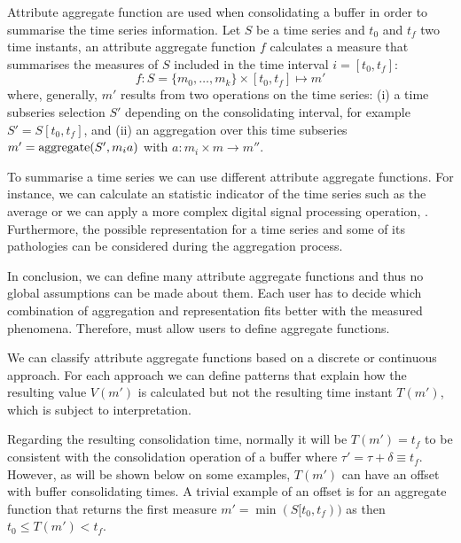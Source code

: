 Attribute aggregate function are used when consolidating a buffer in
order to summarise the time series information. Let $S$ be a time
series and $t_0$ and $t_f$ two time instants, an attribute aggregate
function $f$ calculates a measure that summarises the measures of $S$
included in the time interval $i=[t_0,t_f]$:
\[
f : S=\{m_0,\ldots,m_k\} \times [t_0,t_f] \mapsto m'
\]
where, generally, $m'$ results from two operations on the time series:
(i) a time subseries selection $S'$ depending on the consolidating
interval, for example $S' = S[t_0,t_f]$, and (ii) an aggregation over
this time subseries $m' = \operatorname*{aggregate}(S',m_i a)$ with $a: m_i \times
m\rightarrow m''$.  

To summarise a time series we can use different attribute aggregate
functions.  For instance, we can calculate an statistic indicator of
the time series such as the average or we can apply a more complex
digital signal processing operation, \cite{zhang11}. Furthermore, the
possible representation for a time series and some of its pathologies
can be considered during the aggregation process.


In conclusion, we can define many attribute aggregate functions and
thus no global assumptions can be made about them. Each user has to
decide which combination of aggregation and representation fits better
with the measured phenomena.  Therefore,  must allow users to
define aggregate functions.

We can classify attribute aggregate functions based on a discrete or
continuous approach. For each approach we can define patterns that
explain how the resulting value $V(m')$ is calculated but not the
resulting time instant $T(m')$, which is subject to
interpretation.  


Regarding the resulting consolidation time, normally it will be
$T(m')=t_f$ to be consistent with the consolidation operation of a
buffer where $\tau' = \tau + \delta \equiv t_f$. However, as will be
shown below on some examples, $T(m')$ can have an offset with buffer
consolidating times. A trivial example of an offset is for an
aggregate function that returns the first measure
$m'=\min(S[t_0,t_f))$ as then $t_0 \leq T(m') < t_f$.


